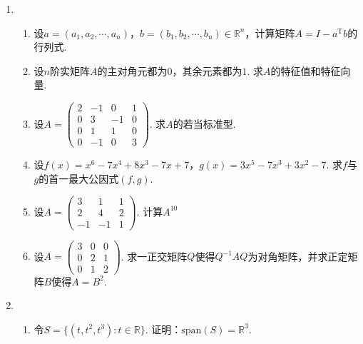 \documentclass{article}
\begin{document}
\begin{enumerate}
\item
\begin{enumerate}
\item
设$a=(a_1,a_2,\cdots,a_n)$，$b=(b_1,b_2,\cdots,b_n)\in\mathbb{R}^n$，计算矩阵$A=I-a^\mathrm{T}b$的行列式.
\item
设$n$阶实矩阵$A$的主对角元都为$0$，其余元素都为$1$. 求$A$的特征值和特征向量.
\item
设$\displaystyle A=\begin{pmatrix}
2 & -1 & 0 & 1\\
0 & 3 & -1 & 0\\
0 & 1 & 1 & 0\\
0 & -1 & 0 & 3
\end{pmatrix}$. 求$A$的若当标准型.
\item
设$f(x)=x^6-7x^4+8x^3-7x+7$，$g(x)=3x^5-7x^3+3x^2-7$. 求$f$与$g$的首一最大公因式$(f,g)$.
\item
设$\displaystyle A=\begin{pmatrix}
3 & 1 & 1\\
2 & 4 & 2\\
-1 & -1 & 1
\end{pmatrix}$. 计算$A^{10}$
\item
设$\displaystyle A=\begin{pmatrix}
3 & 0 & 0\\
0 & 2 & 1\\
0 & 1 & 2
\end{pmatrix}$. 求一正交矩阵$Q$使得$Q^{-1}AQ$为对角矩阵，并求正定矩阵$B$使得$A=B^2$.
\end{enumerate}
\item
\begin{enumerate}
\item
令$S=\{(t,t^2,t^3):t\in\mathbb{R}\}$. 证明：$\mathrm{span}(S)=\mathbb{R}^3$.

\end{enumerate}
\end{enumerate}
\end{document}
